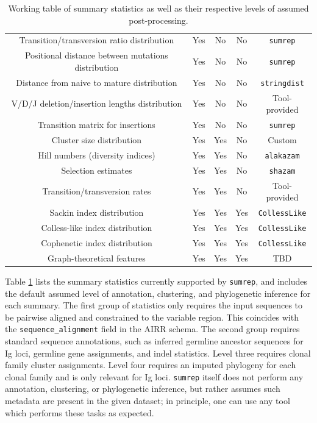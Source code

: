 \documentclass{article}
\begin{document}
\begin{table}
{\begin{tabular}{c|c|c|c|c}
Transition/transversion ratio distribution & Yes & No & No & \texttt{sumrep} \\
Positional distance between mutations distribution & Yes & No & No & \texttt{sumrep}  \\
Distance from naive to mature distribution & Yes & No & No & \texttt{stringdist} \\
V/D/J deletion/insertion lengths distribution & Yes & No & No & Tool-provided \\
Transition matrix for insertions & Yes & No & No & \texttt{sumrep} \\
\hline
Cluster size distribution & Yes & Yes & No & Custom \\
Hill numbers (diversity indices) & Yes & Yes & No & \texttt{alakazam} \\
Selection estimates & Yes & Yes & No & \texttt{shazam} \\
Transition/transversion rates & Yes & Yes & No & Tool-provided \\
\hline
    Sackin index distribution & Yes & Yes & Yes & \texttt{CollessLike} \cite{Mir2018-lk} \\
Colless-like index distribution & Yes & Yes & Yes & \texttt{CollessLike} \\
Cophenetic index distribution & Yes & Yes & Yes & \texttt{CollessLike} \\
Graph-theoretical features & Yes & Yes & Yes & TBD \\
\end{tabular}
}
\caption{Working table of summary statistics as well as their respective levels of assumed post-processing.}
\label{tab:SummaryStatistics}
\end{table}

Table \ref{tab:SummaryStatistics} lists the summary statistics currently supported by \texttt{sumrep}, and includes the default assumed level of annotation, clustering, and phylogenetic inference for each summary.
The first group of statistics only requires the input sequences to be pairwise aligned and constrained to the variable region.
This coincides with the \texttt{sequence\_alignment} field in the AIRR schema.
The second group requires standard sequence annotations, such as inferred germline  ancestor sequences for Ig loci, germline gene assignments, and indel statistics.
Level three requires clonal family cluster assignments.
Level four requires an imputed phylogeny for each clonal family and is only relevant for Ig loci.
\texttt{sumrep} itself does not perform any annotation, clustering, or phylogenetic inference, but rather assumes such metadata are present in the given dataset; in principle, one can use any tool which performs these tasks as expected.
\end{document}
